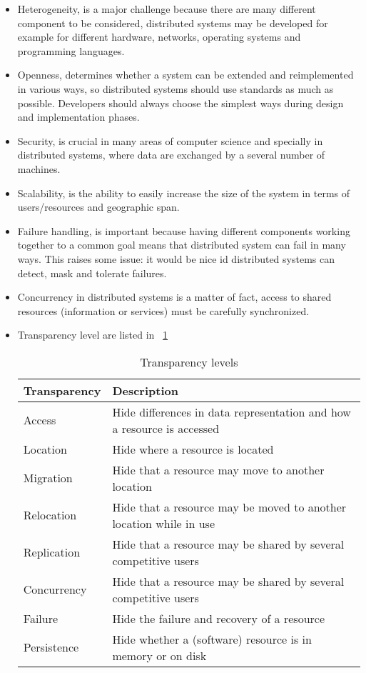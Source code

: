 \begin{itemize}
	\item Heterogeneity, is a major challenge because there are many different component to be considered, distributed systems may be developed for example for different hardware, networks, operating systems and programming languages.
	\item Openness, determines whether a system can be extended and reimplemented in various ways, so distributed systems should use standards as much as possible. Developers should always choose the simplest ways during design and implementation phases.
	\item Security, is crucial in many areas of computer science and specially in distributed systems, where data are exchanged by a several number of machines.
	\item Scalability, is the ability to easily increase the size of the system in terms of users/resources and geographic
	span.
	\item Failure handling, is important because having different components working together to a common goal means that distributed system can fail in many ways. This raises some issue: it would be nice id distributed systems can detect, mask and tolerate failures.
	\item Concurrency in distributed systems is a matter of
	fact, access to shared resources (information or services)
	must be carefully synchronized.
	\item Transparency level are listed in \tablename~\ref{tab:transparency}
	\begin{table}[h]
		\caption{Transparency levels}
		\label{tab:transparency}
		\centering
		\begin{tabular}{ll}
			\toprule
			\textbf{Transparency} & \textbf{Description}\\
			\midrule
			Access & Hide differences in data representation and how a resource is accessed\\
			Location & Hide where a resource is located\\
			Migration & Hide that a resource may move to another location\\
			Relocation & Hide that a resource may be moved to another location while in use\\
			Replication & Hide that a resource may be shared by several competitive users\\
			Concurrency & Hide that a resource may be shared by several competitive users\\
			Failure & Hide the failure and recovery of a resource\\
			Persistence & Hide whether a (software) resource is in memory or on disk\\
			\bottomrule
		\end{tabular}
	\end{table}
\end{itemize}

